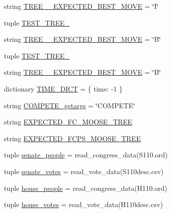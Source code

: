 \begin{DoxyCompactItemize}
\item 
string \hyperlink{namespacetests_a3a04ebf782d9c2b42f4a688df3bc8cd7}{T\+R\+E\+E\+\_\+\_\+\+E\+X\+P\+E\+C\+T\+E\+D\+\_\+\+B\+E\+S\+T\+\_\+\+M\+O\+V\+E} = \char`\"{}I\char`\"{}
\item 
tuple \hyperlink{namespacetests_ac8a5147066692f8370714f2b2bf0593f}{T\+E\+S\+T\+\_\+\+T\+R\+E\+E\+\_}
\item 
string \hyperlink{namespacetests_a420cb1c5f04b3fd00ecacc0d3b8dcb87}{T\+R\+E\+E\+\_\+\_\+\+E\+X\+P\+E\+C\+T\+E\+D\+\_\+\+B\+E\+S\+T\+\_\+\+M\+O\+V\+E} = \char`\"{}B\char`\"{}
\item 
tuple \hyperlink{namespacetests_ac06c4b9bdd7838d7789c327dac2157f9}{T\+E\+S\+T\+\_\+\+T\+R\+E\+E\+\_}
\item 
string \hyperlink{namespacetests_aaddd327b572bc441ddc7dafc86d6870b}{T\+R\+E\+E\+\_\+\_\+\+E\+X\+P\+E\+C\+T\+E\+D\+\_\+\+B\+E\+S\+T\+\_\+\+M\+O\+V\+E} = \char`\"{}B\char`\"{}
\item 
dictionary \hyperlink{namespacetests_aea36cbc2a5be89562f35ed50cd9f7a2a}{T\+I\+M\+E\+\_\+\+D\+I\+C\+T} = \{ \textquotesingle{}time\textquotesingle{}\+: -\/1 \}
\item 
string \hyperlink{namespacetests_a1a0fc2a6d8a34d209aed60b79b62fc4e}{C\+O\+M\+P\+E\+T\+E\+\_\+getargs} = \char`\"{}C\+O\+M\+P\+E\+T\+E\char`\"{}
\item 
string \hyperlink{namespacetests_a22847012a44a5628b53cb446b65ae99b}{E\+X\+P\+E\+C\+T\+E\+D\+\_\+\+F\+C\+\_\+\+M\+O\+O\+S\+E\+\_\+\+T\+R\+E\+E}
\item 
string \hyperlink{namespacetests_aeb3dec3064640f57137f1a71ca72708d}{E\+X\+P\+E\+C\+T\+E\+D\+\_\+\+F\+C\+P\+S\+\_\+\+M\+O\+O\+S\+E\+\_\+\+T\+R\+E\+E}
\item 
tuple \hyperlink{namespacetests_a76731f212803054faab680e5139f44e4}{senate\+\_\+people} = read\+\_\+congress\+\_\+data(\textquotesingle{}S110.\+ord\textquotesingle{})
\item 
tuple \hyperlink{namespacetests_a31fa9b044d03a027e3ab901df1eae4f3}{senate\+\_\+votes} = read\+\_\+vote\+\_\+data(\textquotesingle{}S110desc.\+csv\textquotesingle{})
\item 
tuple \hyperlink{namespacetests_a8f6f8292cd13d4fbdb36cf4d430a703c}{house\+\_\+people} = read\+\_\+congress\+\_\+data(\textquotesingle{}H110.\+ord\textquotesingle{})
\item 
tuple \hyperlink{namespacetests_abda5725c592333b8525d7cff7ca83cfc}{house\+\_\+votes} = read\+\_\+vote\+\_\+data(\textquotesingle{}H110desc.\+csv\textquotesingle{})

\end{DoxyCompactItemize}
